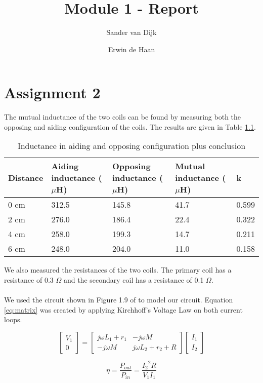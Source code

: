 \documentclass[final]{scrreprt} %
\title{Module 1 - Report}
\author{Sander {van Dijk} \and Erwin {de Haan}}
\begin{document}
\chapter{Assignment 2}
The mutual inductance of the two coils can be found by measuring both the opposing and aiding configuration of the coils. The results are given in Table \ref{tab:inductances}.

\begin{table} [h]
\begin{center}
	\begin{tabular}{ l | l | l | l | l }
	Distance & Aiding inductance ($\mu$H) & Opposing inductance ($\mu$H) & Mutual inductance ($\mu$H) & k \\ \hline
  	0 cm & 312.5 & 145.8 & 41.7 & 0.599 \\
	2 cm & 276.0 & 186.4 & 22.4 & 0.322 \\
	4 cm & 258.0 & 199.3 & 14.7 & 0.211 \\
	6 cm & 248.0 & 204.0 & 11.0 & 0.158 \\
	\end{tabular}
	\caption{Inductance in aiding and opposing configuration plus conclusion}
	\label{tab:inductances}
\end{center}
\end{table}

We also measured the resistances of the two coils. The primary coil has a resistance of 0.3 $\Omega$ and the secondary coil has a resistance of 0.1 $\Omega$.
\\ \\
We used the circuit shown in Figure 1.9 of \cite{epo4-manual} to model our circuit. Equation \ref{eq:matrix} was created by applying Kirchhoff's Voltage Law on both current loops.

\begin{equation}
	\begin{bmatrix}
		V_1 \\
		0
	\end{bmatrix} =
	\begin{bmatrix}
		j \omega L_1 + r_1 & -j \omega M \\
		-j \omega M & j \omega L_2 + r_2 + R
	\end{bmatrix}
	\begin{bmatrix}
		I_1 \\
		I_2
	\end{bmatrix}
	\label{eq:matrix}
\end{equation}

\begin{equation}
	\eta = \frac{P_{out}}{P_{in}} = \frac{{I_2}^2 R}{V_1 I_1}
	\label{eq:efficiency}
\end{equation}
\end{document}
